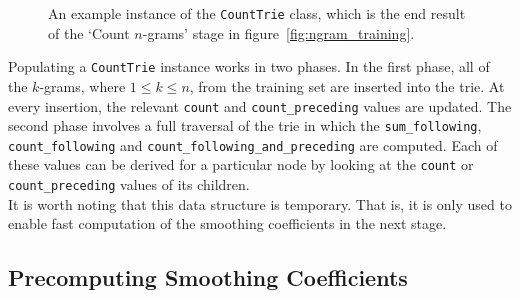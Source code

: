 \documentclass[a4paper, 12pt]{report}
\newcommand{\ttt}[1]{\texttt{#1}}
\newcommand{\tit}[1]{\textit{#1}}
\begin{document}
\begin{figure}[h]
\caption{An example instance of the \ttt{CountTrie} class, which is the end result of the `Count $n$-grams' stage in figure~\ref{fig:ngram_training}.}
\label{fig:count_trie}
\end{figure}

Populating a \ttt{CountTrie} instance works in two phases. In the first phase, all of the $k$-grams, where $1 \leq k \leq n$, from the training set are inserted into the trie. At every insertion, the relevant \ttt{count} and \ttt{count\_preceding} values are updated. The second phase involves a full traversal of the trie in which the \ttt{sum\_following}, \ttt{count\_following} and \ttt{count\_following\_and\_preceding} are computed. Each of these values can be derived for a particular node by looking at the \ttt{count} or \ttt{count\_preceding} values of its children. \\

It is worth noting that this data structure is temporary. That is, it is only used to enable fast computation of the smoothing coefficients in the next stage.

\subsection{Precomputing Smoothing Coefficients} \label{ngram_precompute}
\end{document}
